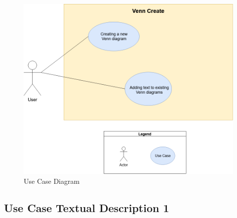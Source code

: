 \documentclass[fontsize=12pt,paper=letter,twoside]{scrartcl}
\begin{document}
\begin{figure}[hbt]
	\begin{mdframed}
		\includegraphics[width=\textwidth]{images/use-case-diagram.png}
	\end{mdframed}
	\caption{Use Case Diagram}
\end{figure}

\newpage

\subsection*{Use Case Textual Description 1}
\end{document}
